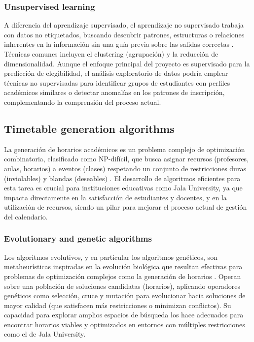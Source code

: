 \subsubsection{Unsupervised learning}
A diferencia del aprendizaje supervisado, el aprendizaje no supervisado trabaja con datos no etiquetados, buscando descubrir patrones, estructuras o relaciones inherentes en la información sin una guía previa sobre las salidas correctas \parencite{Hastie2009}.
Técnicas comunes incluyen el clustering (agrupación) y la reducción de dimensionalidad. Aunque el enfoque principal del proyecto es supervisado para la predicción de elegibilidad, el análisis exploratorio de datos podría emplear técnicas no supervisadas para identificar grupos de estudiantes con perfiles académicos similares o detectar anomalías en los patrones de inscripción, complementando la comprensión del proceso actual.

\subsection{Timetable generation algorithms}
La generación de horarios académicos es un problema complejo de optimización combinatoria, clasificado como NP-difícil, que busca asignar recursos (profesores, aulas, horarios) a eventos (clases) respetando un conjunto de restricciones duras (inviolables) y blandas (deseables) \parencite{Schaerf1999}.
El desarrollo de algoritmos eficientes para esta tarea es crucial para instituciones educativas como Jala University, ya que impacta directamente en la satisfacción de estudiantes y docentes, y en la utilización de recursos, siendo un pilar para mejorar el proceso actual de gestión del calendario.

\subsubsection{Evolutionary and genetic algorithms}
Los algoritmos evolutivos, y en particular los algoritmos genéticos, son metaheurísticas inspiradas en la evolución biológica que resultan efectivas para problemas de optimización complejos como la generación de horarios \parencite{Eiben2003}.
Operan sobre una población de soluciones candidatas (horarios), aplicando operadores genéticos como selección, cruce y mutación para evolucionar hacia soluciones de mayor calidad (que satisfacen más restricciones o minimizan conflictos). Su capacidad para explorar amplios espacios de búsqueda los hace adecuados para encontrar horarios viables y optimizados en entornos con múltiples restricciones como el de Jala University.

